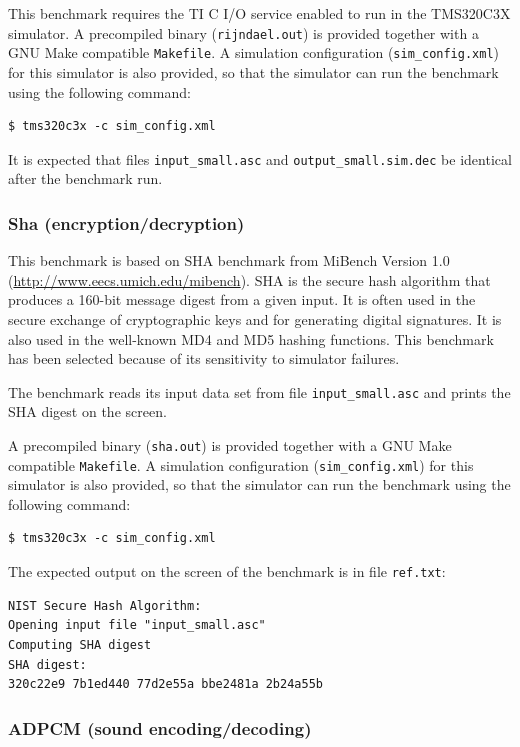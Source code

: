This benchmark requires the TI C I/O service enabled to run in the TMS320C3X simulator.
A precompiled binary (\texttt{rijndael.out}) is provided together with a GNU Make compatible \texttt{Makefile}.
A simulation configuration (\texttt{sim\_config.xml}) for this simulator is also provided, so that the simulator can run the benchmark using the following command:

\begin{verbatim}
$ tms320c3x -c sim_config.xml
\end{verbatim}

It is expected that files \texttt{input\_small.asc} and \texttt{output\_small.sim.dec} be identical after the benchmark run.

\subsubsection{Sha (encryption/decryption)}

This benchmark is based on SHA benchmark from MiBench Version 1.0 (\url{http://www.eecs.umich.edu/mibench}).
SHA is the secure hash algorithm that produces a 160-bit message digest from a given input.
It is often used in the secure exchange of cryptographic keys and for generating digital signatures.
It is also used in the well-known MD4 and MD5 hashing functions.
This benchmark has been selected because of its sensitivity to simulator failures.

The benchmark reads its input data set from file \texttt{input\_small.asc} and prints the SHA digest on the screen.

A precompiled binary (\texttt{sha.out}) is provided together with a GNU Make compatible \texttt{Makefile}.
A simulation configuration (\texttt{sim\_config.xml}) for this simulator is also provided, so that the simulator can run the benchmark using the following command:

\begin{verbatim}
$ tms320c3x -c sim_config.xml
\end{verbatim}

The expected output on the screen of the benchmark is in file \texttt{ref.txt}:

\begin{verbatim}
NIST Secure Hash Algorithm:
Opening input file "input_small.asc"
Computing SHA digest
SHA digest:
320c22e9 7b1ed440 77d2e55a bbe2481a 2b24a55b
\end{verbatim}

\subsubsection{ADPCM (sound encoding/decoding)}


